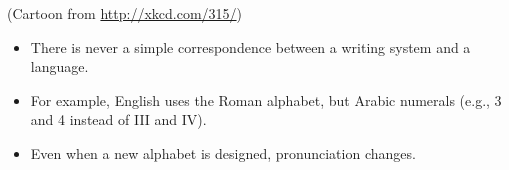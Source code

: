 \documentclass[a4paper,landscape,headrule,footrule,xetex]{foils}
\begin{document}
(Cartoon from \url{http://xkcd.com/315/})


\begin{itemize}
\item There is never a simple correspondence between a writing system
  and a language.
\item For example, English uses the Roman alphabet, but Arabic numerals (e.g., 3 and 4 instead of III and IV).
\item Even when a new alphabet is designed, pronunciation changes.

\end{itemize}
























\end{document}
